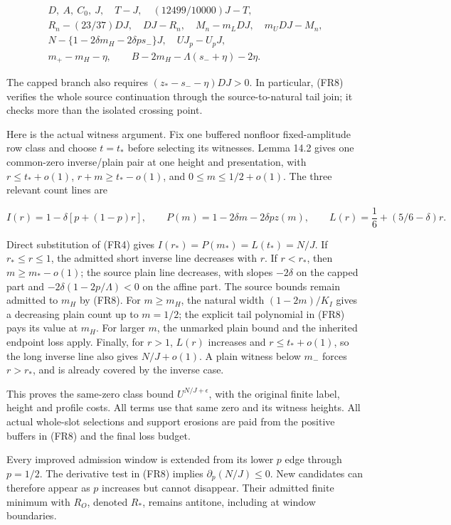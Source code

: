 \[
\begin{gathered}
D,\ A,\ C_0,\ J,\quad T-J,\quad (12499/10000)J-T,\\
R_n-(23/37)DJ,\quad DJ-R_n,\quad
M_n-m_LDJ,\quad m_UDJ-M_n,\\
N-\{1-2\delta m_H-2\delta p s_-\}J,\quad
UJ_p-U_pJ,\\
m_+-m_H-\eta,\qquad
B-2m_H-\Lambda(s_-+\eta)-2\eta.
\end{gathered}
\tag{FR8}
\]

The capped branch also requires \((z_*-s_--\eta)DJ>0\). In particular, (FR8) verifies the whole source continuation through the source-to-natural tail join; it checks more than the isolated crossing point.

Here is the actual witness argument. Fix one buffered nonfloor fixed-amplitude row class and choose \(t=t_*\) before selecting its witnesses. Lemma 14.2 gives one common-zero inverse/plain pair at one height and presentation, with \(r\le t_*+o(1)\), \(r+m\ge t_*-o(1)\), and \(0\le m\le1/2+o(1)\). The three relevant count lines are

\[
I(r)=1-\delta[p+(1-p)r],\qquad
P(m)=1-2\delta m-2\delta pz(m),\qquad
L(r)=\frac16+(5/6-\delta)r.
\tag{FR9}
\]

Direct substitution of (FR4) gives \(I(r_*)=P(m_*)=L(t_*)=N/J\). If \(r_*\le r\le1\), the admitted short inverse line decreases with \(r\). If \(r<r_*\), then \(m\ge m_*-o(1)\); the source plain line decreases, with slopes \(-2\delta\) on the capped part and \(-2\delta(1-2p/\Lambda)<0\) on the affine part. The source bounds remain admitted to \(m_H\) by (FR8). For \(m\ge m_H\), the natural width \((1-2m)/K_I\) gives a decreasing plain count up to \(m=1/2\); the explicit tail polynomial in (FR8) pays its value at \(m_H\). For larger \(m\), the unmarked plain bound and the inherited endpoint loss apply. Finally, for \(r>1\), \(L(r)\) increases and \(r\le t_*+o(1)\), so the long inverse line also gives \(N/J+o(1)\). A plain witness below \(m_-\) forces \(r>r_*\), and is already covered by the inverse case.

This proves the same-zero class bound \(U^{N/J+\epsilon}\), with the original finite label, height and profile costs. All terms use that same zero and its witness heights. All actual whole-slot selections and support erosions are paid from the positive buffers in (FR8) and the final loss budget.

Every improved admission window is extended from its lower \(p\) edge through \(p=1/2\). The derivative test in (FR8) implies \(\partial_p(N/J)\le0\). New candidates can therefore appear as \(p\) increases but cannot disappear. Their admitted finite minimum with \(R_O\), denoted \(R_*\), remains antitone, including at window boundaries.

